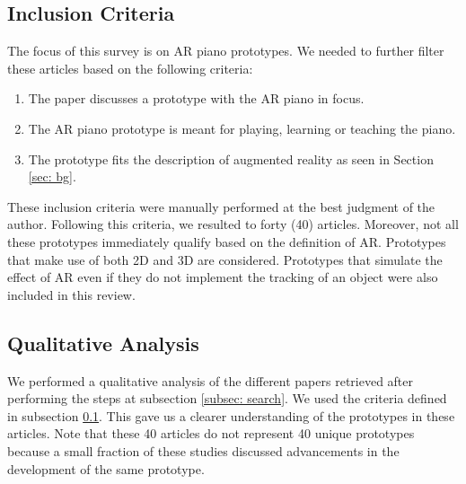 \documentclass[manuscript,screen]{acmart}
\begin{document}
\subsection{Inclusion Criteria}
\label{subsec: criteria}
The focus of this survey is on AR piano prototypes. We needed to further filter these articles based on the following criteria:
\begin{enumerate}
    \item The paper discusses a prototype with the AR piano in focus.  
    \item The AR piano prototype is meant for playing, learning or teaching the piano.
    \item The prototype fits the description of augmented reality as seen in Section \ref{sec: bg}.
\end{enumerate}
These inclusion criteria were manually performed at the best judgment of the author. Following this criteria, we resulted to forty (40) articles. Moreover, not all these prototypes immediately qualify based on the definition of AR. Prototypes that make use of both 2D and 3D are considered. Prototypes that simulate the effect of AR even if they do not implement the tracking of an object were also included in this review. 

\subsection{Qualitative Analysis}
We performed a qualitative analysis of the different papers retrieved after performing the steps at subsection \ref{subsec: search}. We used the criteria defined in subsection \ref{subsec: criteria}. This gave us a clearer understanding of the prototypes in these articles. Note that these 40 articles do not represent 40 unique prototypes because a small fraction of these studies discussed advancements in the development of the same prototype.
\end{document}

